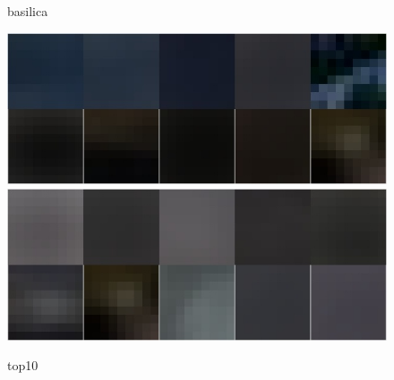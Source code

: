 \documentclass[12pt]{article}
\begin{document}
\begin{figure}[!htbp]
\begin{minipage}[t]{0.2 \textwidth}
    \caption*{basilica}
  \end{minipage}
  \begin{minipage}[t]{0.45 \textwidth}
    \centering \includegraphics[width= \linewidth]{./figures/basilica_top10} 
    \centering \includegraphics[width= \linewidth]{./figures/basilica2_top10} 
    \caption*{top10}
  \end{minipage}


\end{figure}
\end{document}
